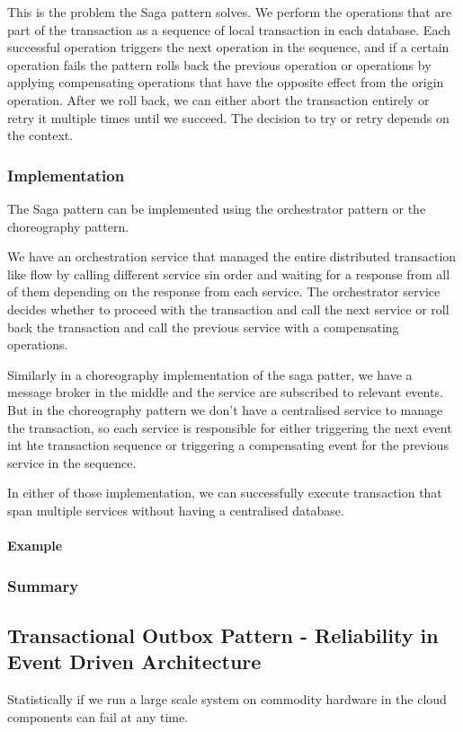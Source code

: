 This is the problem the Saga pattern solves.
We perform the operations that are part of the transaction as a sequence of local transaction in each database.
Each successful operation triggers the next operation in the sequence, and if a certain operation fails the pattern rolls back the previous operation or operations by applying compensating operations that have the opposite effect from the origin operation.
After we roll back, we can either abort the transaction entirely or retry it multiple times until we succeed.
The decision to try or retry depends on the context.

\subsubsection{Implementation}
The Saga pattern can be implemented using the orchestrator pattern or the choreography pattern.

We have an orchestration service that managed the entire distributed transaction like flow by calling different service sin order and waiting for a response from all of them depending on the response from each service.
The orchestrator service decides whether to proceed with the transaction and call the next service or roll back the transaction and call the previous service with a compensating operations.

Similarly in a choreography implementation of the saga patter, we have a message broker in the middle and the service are subscribed to relevant events.
But in the choreography pattern we don't have a centralised service to manage the transaction, so each service is responsible for either triggering the next event int hte transaction sequence or triggering a compensating event for the previous service in the sequence.

In either of those implementation, we can successfully execute transaction that span multiple services without having a centralised database.

\paragraph{Example}

\subsubsection{Summary}

\subsection{Transactional Outbox Pattern - Reliability in Event Driven Architecture}
Statistically if we run a large scale system on commodity hardware in the cloud components can fail at any time.

